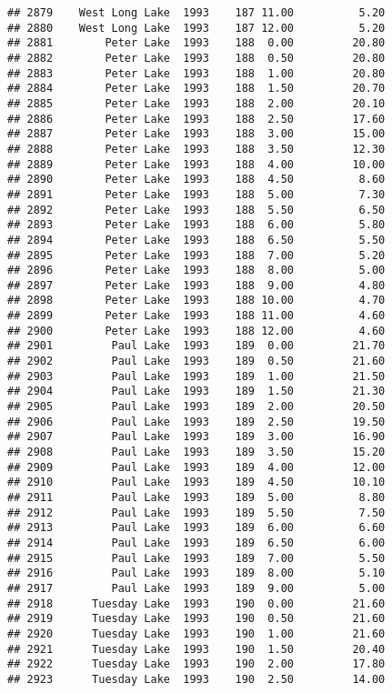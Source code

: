 \documentclass[
]{article}
\begin{document}
\begin{verbatim}
## 2879    West Long Lake  1993    187 11.00          5.20
## 2880    West Long Lake  1993    187 12.00          5.20
## 2881        Peter Lake  1993    188  0.00         20.80
## 2882        Peter Lake  1993    188  0.50         20.80
## 2883        Peter Lake  1993    188  1.00         20.80
## 2884        Peter Lake  1993    188  1.50         20.70
## 2885        Peter Lake  1993    188  2.00         20.10
## 2886        Peter Lake  1993    188  2.50         17.60
## 2887        Peter Lake  1993    188  3.00         15.00
## 2888        Peter Lake  1993    188  3.50         12.30
## 2889        Peter Lake  1993    188  4.00         10.00
## 2890        Peter Lake  1993    188  4.50          8.60
## 2891        Peter Lake  1993    188  5.00          7.30
## 2892        Peter Lake  1993    188  5.50          6.50
## 2893        Peter Lake  1993    188  6.00          5.80
## 2894        Peter Lake  1993    188  6.50          5.50
## 2895        Peter Lake  1993    188  7.00          5.20
## 2896        Peter Lake  1993    188  8.00          5.00
## 2897        Peter Lake  1993    188  9.00          4.80
## 2898        Peter Lake  1993    188 10.00          4.70
## 2899        Peter Lake  1993    188 11.00          4.60
## 2900        Peter Lake  1993    188 12.00          4.60
## 2901         Paul Lake  1993    189  0.00         21.70
## 2902         Paul Lake  1993    189  0.50         21.60
## 2903         Paul Lake  1993    189  1.00         21.50
## 2904         Paul Lake  1993    189  1.50         21.30
## 2905         Paul Lake  1993    189  2.00         20.50
## 2906         Paul Lake  1993    189  2.50         19.50
## 2907         Paul Lake  1993    189  3.00         16.90
## 2908         Paul Lake  1993    189  3.50         15.20
## 2909         Paul Lake  1993    189  4.00         12.00
## 2910         Paul Lake  1993    189  4.50         10.10
## 2911         Paul Lake  1993    189  5.00          8.80
## 2912         Paul Lake  1993    189  5.50          7.50
## 2913         Paul Lake  1993    189  6.00          6.60
## 2914         Paul Lake  1993    189  6.50          6.00
## 2915         Paul Lake  1993    189  7.00          5.50
## 2916         Paul Lake  1993    189  8.00          5.10
## 2917         Paul Lake  1993    189  9.00          5.00
## 2918      Tuesday Lake  1993    190  0.00         21.60
## 2919      Tuesday Lake  1993    190  0.50         21.60
## 2920      Tuesday Lake  1993    190  1.00         21.60
## 2921      Tuesday Lake  1993    190  1.50         20.40
## 2922      Tuesday Lake  1993    190  2.00         17.80
## 2923      Tuesday Lake  1993    190  2.50         14.00

\end{verbatim}
\end{document}
